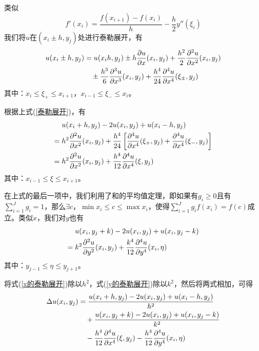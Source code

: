             类似
            \[
                f'(x_i) = \frac{f(x_{i+1}) - f(x_i)}{h} - \frac{h}{2} y''(\xi_i)
            \]
            我们将$u$在$(x_{i}\pm h, y_j)$处进行泰勒展开，有
            \begin{align}
                \label{泰勒展开}
               u (x_i\pm h,y_j)
               &= u (x_i h,y_j) \pm h \frac{\partial u}{\partial x}(x_i,y_j) + \frac{h^2}{2} \frac{\partial^2 u}{\partial x^2}(x_i,y_j) \notag\\
               &\quad\pm \frac{h^3}{6} \frac{\partial^3 u}{\partial x^3}(x_i,y_j) + \frac{h^4}{24} \frac{\partial^4 u}{\partial x^4}(\xi_\pm,y_j)
            \end{align}
            其中：$x_i \leqslant \xi_+ \leqslant x_{i+1}$，$x_{i-1} \leqslant \xi_- \leqslant x_{i}$。
            \par
            根据上式(\ref{泰勒展开})，有
            \begin{align}
            \label{x的泰勒展开}
                   &u (x_i + h,y_j) -2u(x_i,y_j) + u(x_i-h,y_j) \notag\\
               ={} &h^2 \frac{\partial^2 u}{\partial x^2}(x_i,y_j) + \frac{h^4}{24} \left[
               \frac{\partial^4 u}{\partial x^4}(\xi_+,y_j) + \frac{\partial^4 u}{\partial x^4}(\xi_-,y_j)
               \right] \notag \\
               ={} &h^2 \frac{\partial^2 u}{\partial x^2}(x_i,y_j) + \frac{h^4}{12} \frac{\partial^4 u}{\partial x^4}(\xi,y_j)
            \end{align}
            其中：$x_{i-1} \leqslant \xi \leqslant x_{i+1}$。
            \par
            在上式的最后一项中，我们利用了和的平均值定理，即如果有$g_i \geqslant 0$且有$\sum _{i =1}^J g_i = 1$，那么$\exists c$，$ \min x_i \leqslant c \leqslant \max x_i$，使得$\sum _{i =1}^J g_if(x_i) = f(c)$成立。类似$x$，我们对$y$也有
            \begin{align}
            \label{y的泰勒展开}
                   &u (x_i ,y_j + k) - 2u(x_i,y_j) + u(x_i,y_j - k) \notag \\
               ={} &k^2 \frac{\partial^2 u}{\partial y^2}(x_i,y_j) + \frac{k^4}{12} \frac{\partial^4 u}{\partial y^4}(x_i,\eta)
            \end{align}
            其中：$y_{j-1} \leqslant \eta \leqslant y_{j+1}$。
            \par
            将式(\ref{x的泰勒展开})除以$h^2$，式(\ref{y的泰勒展开})除以$k^2$，然后将两式相加，可得
            \begin{align}
            \label{u的泰勒展开}
                \Delta u(x_i,y_j) &= \frac{u(x_i+h,y_j) - 2u(x_i,y_j)+u(x_i-h, y_j)}{h^2}\notag \\
                &\quad + \frac{u(x_i,y_j + k) - 2u(x_i,y_j)+u(x_i, y_j - k)}{k^2}\notag \\
                &\quad - \frac{h^4}{12} \frac{\partial^4 u}{\partial x^4}(\xi,y_j) - \frac{h^4}{12} \frac{\partial^4 u}{\partial y^4}(x_i,\eta)
            \end{align}
